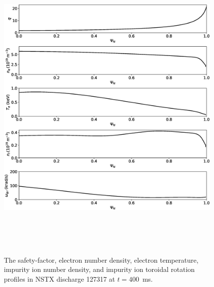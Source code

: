 \documentclass[12pt,prb,aps]{revtex4-1}
\begin{document}
\begin{figure}
\centerline{\includegraphics[height=6.25in]{Fig2.eps}}
\caption{The safety-factor, electron number density, electron temperature, impurity ion number density, and  impurity ion toroidal rotation profiles in NSTX discharge 127317 at $t=400$\, ms.}\label{fig2}
\end{figure}
\end{document}
